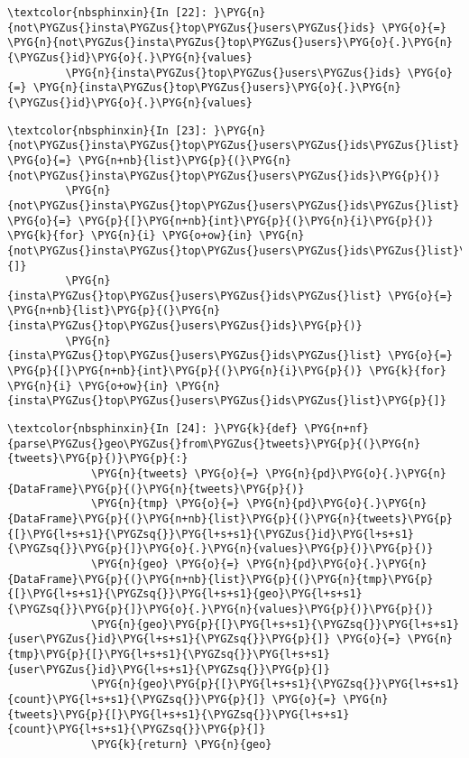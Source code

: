 \documentclass[letterpaper,10pt,english]{sphinxmanual}
\begin{document}
%
\begin{Verbatim}[commandchars=\\\{\}]
\textcolor{nbsphinxin}{In [22]: }\PYG{n}{not\PYGZus{}insta\PYGZus{}top\PYGZus{}users\PYGZus{}ids} \PYG{o}{=} \PYG{n}{not\PYGZus{}insta\PYGZus{}top\PYGZus{}users}\PYG{o}{.}\PYG{n}{\PYGZus{}id}\PYG{o}{.}\PYG{n}{values}
         \PYG{n}{insta\PYGZus{}top\PYGZus{}users\PYGZus{}ids} \PYG{o}{=} \PYG{n}{insta\PYGZus{}top\PYGZus{}users}\PYG{o}{.}\PYG{n}{\PYGZus{}id}\PYG{o}{.}\PYG{n}{values}
\end{Verbatim}

%
\begin{Verbatim}[commandchars=\\\{\}]
\textcolor{nbsphinxin}{In [23]: }\PYG{n}{not\PYGZus{}insta\PYGZus{}top\PYGZus{}users\PYGZus{}ids\PYGZus{}list} \PYG{o}{=} \PYG{n+nb}{list}\PYG{p}{(}\PYG{n}{not\PYGZus{}insta\PYGZus{}top\PYGZus{}users\PYGZus{}ids}\PYG{p}{)}
         \PYG{n}{not\PYGZus{}insta\PYGZus{}top\PYGZus{}users\PYGZus{}ids\PYGZus{}list} \PYG{o}{=} \PYG{p}{[}\PYG{n+nb}{int}\PYG{p}{(}\PYG{n}{i}\PYG{p}{)} \PYG{k}{for} \PYG{n}{i} \PYG{o+ow}{in} \PYG{n}{not\PYGZus{}insta\PYGZus{}top\PYGZus{}users\PYGZus{}ids\PYGZus{}list}\PYG{p}{]}
         \PYG{n}{insta\PYGZus{}top\PYGZus{}users\PYGZus{}ids\PYGZus{}list} \PYG{o}{=} \PYG{n+nb}{list}\PYG{p}{(}\PYG{n}{insta\PYGZus{}top\PYGZus{}users\PYGZus{}ids}\PYG{p}{)}
         \PYG{n}{insta\PYGZus{}top\PYGZus{}users\PYGZus{}ids\PYGZus{}list} \PYG{o}{=} \PYG{p}{[}\PYG{n+nb}{int}\PYG{p}{(}\PYG{n}{i}\PYG{p}{)} \PYG{k}{for} \PYG{n}{i} \PYG{o+ow}{in} \PYG{n}{insta\PYGZus{}top\PYGZus{}users\PYGZus{}ids\PYGZus{}list}\PYG{p}{]}
\end{Verbatim}

%
\begin{Verbatim}[commandchars=\\\{\}]
\textcolor{nbsphinxin}{In [24]: }\PYG{k}{def} \PYG{n+nf}{parse\PYGZus{}geo\PYGZus{}from\PYGZus{}tweets}\PYG{p}{(}\PYG{n}{tweets}\PYG{p}{)}\PYG{p}{:}
             \PYG{n}{tweets} \PYG{o}{=} \PYG{n}{pd}\PYG{o}{.}\PYG{n}{DataFrame}\PYG{p}{(}\PYG{n}{tweets}\PYG{p}{)}
             \PYG{n}{tmp} \PYG{o}{=} \PYG{n}{pd}\PYG{o}{.}\PYG{n}{DataFrame}\PYG{p}{(}\PYG{n+nb}{list}\PYG{p}{(}\PYG{n}{tweets}\PYG{p}{[}\PYG{l+s+s1}{\PYGZsq{}}\PYG{l+s+s1}{\PYGZus{}id}\PYG{l+s+s1}{\PYGZsq{}}\PYG{p}{]}\PYG{o}{.}\PYG{n}{values}\PYG{p}{)}\PYG{p}{)}
             \PYG{n}{geo} \PYG{o}{=} \PYG{n}{pd}\PYG{o}{.}\PYG{n}{DataFrame}\PYG{p}{(}\PYG{n+nb}{list}\PYG{p}{(}\PYG{n}{tmp}\PYG{p}{[}\PYG{l+s+s1}{\PYGZsq{}}\PYG{l+s+s1}{geo}\PYG{l+s+s1}{\PYGZsq{}}\PYG{p}{]}\PYG{o}{.}\PYG{n}{values}\PYG{p}{)}\PYG{p}{)}
             \PYG{n}{geo}\PYG{p}{[}\PYG{l+s+s1}{\PYGZsq{}}\PYG{l+s+s1}{user\PYGZus{}id}\PYG{l+s+s1}{\PYGZsq{}}\PYG{p}{]} \PYG{o}{=} \PYG{n}{tmp}\PYG{p}{[}\PYG{l+s+s1}{\PYGZsq{}}\PYG{l+s+s1}{user\PYGZus{}id}\PYG{l+s+s1}{\PYGZsq{}}\PYG{p}{]}
             \PYG{n}{geo}\PYG{p}{[}\PYG{l+s+s1}{\PYGZsq{}}\PYG{l+s+s1}{count}\PYG{l+s+s1}{\PYGZsq{}}\PYG{p}{]} \PYG{o}{=} \PYG{n}{tweets}\PYG{p}{[}\PYG{l+s+s1}{\PYGZsq{}}\PYG{l+s+s1}{count}\PYG{l+s+s1}{\PYGZsq{}}\PYG{p}{]}
             \PYG{k}{return} \PYG{n}{geo}
\end{Verbatim}
\end{document}
